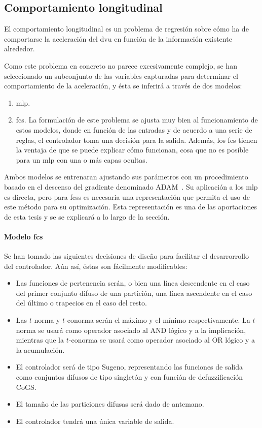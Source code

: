 \subsection{Comportamiento longitudinal}

El comportamiento longitudinal es un problema de regresión sobre cómo ha de comportarse la aceleración del \ac{dvu} en función de la información existente alrededor.

Como este problema en concreto no parece excesivamente complejo, se han seleccionado un subconjunto de las variables capturadas para determinar el comportamiento de la aceleración, y ésta se inferirá a través de dos modelos:

\begin{enumerate}
	\item \ac{mlp}. 
	\item \ac{fcs}. La formulación de este problema se ajusta muy bien al funcionamiento de estos modelos, donde en función de las entradas y de acuerdo a una serie de reglas, el controlador toma una decisión para la salida. Además, los \ac{fcs} tienen la ventaja de que se puede explicar cómo funcionan, cosa que no es posible para un \ac{mlp} con una o más capas ocultas.
\end{enumerate}

Ambos modelos se entrenaran ajustando sus parámetros con un procedimiento basado en el descenso del gradiente denominado ADAM~\cite{kingma2014adam}. Su aplicación a los \ac{mlp} es directa, pero para \acp{fcs} es necesaria una representación que permita el uso de este método para su optimización. Esta representación es una de las aportaciones de esta tesis y se se explicará a lo largo de la sección.

\paragraph{Modelo \ac{fcs}}

Se han tomado las siguientes decisiones de diseño para facilitar el desarrorrollo del controlador. Aún así, éstas son fácilmente modificables:

\begin{itemize}
	\item Las funciones de pertenencia serán, o bien una línea descendente en el caso del primer conjunto difuso de una partición, una línea ascendente en el caso del último o trapecios en el caso del resto.
	\item Las $t$-norma y $t$-conorma serán el máximo y el mínimo respectivamente. La $t$-norma se usará como operador asociado al AND lógico y a la implicación, mientras que la $t$-conorma se usará como operador asociado al OR lógico y a la acumulación.
	\item El controlador será de tipo Sugeno, representando las funciones de salida como conjuntos difusos de tipo singletón y con función de defuzzificación CoGS.
	\item El tamaño de las particiones difusas será dado de antemano.
	\item El controlador tendrá una única variable de salida.
\end{itemize}

